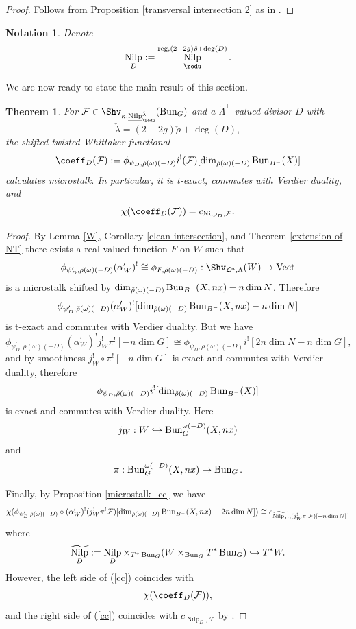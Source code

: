 \documentclass[9pt]{amsart}
\DeclareMathOperator{\reg}{{reg}}
\newcommand{\cF}{{\mathcal F}}
\newcommand{\cL}{{\mathcal L}}
\newtheorem{thm}[subsubsection]{Theorem}
\DeclareMathOperator{\Nilp}{{Nilp}} \DeclareMathOperator{\op}{{op}}
\DeclareMathOperator{\Vect}{{Vect}}
\newtheorem{ntn}[subsubsection]{Notation}
\numberwithin{equation}{section}
\begin{document}
\begin{proof}
	Follows from Proposition \ref{transversal intersection 2} as in \cite[Proposition 3.3.3]{NT}.
\end{proof}

\begin{ntn}
	Denote $$\Nilp_D:= \Nilp^{\reg, (2-2g)\check{\rho} + \deg(D)}_{\redu}.$$
\end{ntn}

We are now ready to state the main result of this section. 

\begin{thm}\label{whittaker functional is microstalk}
	For $\cF \in \Shv_{\kappa, \underline{\Nilp}_{\redu}^{\check{\lambda}}}(\Bun_G)$ and a $\check{\Lambda}^+$-valued divisor $D$ with $$\check{\lambda} = (2-2g)\check{\rho} + \deg(D),$$ the shifted twisted Whittaker functional 
	$$\coeff_D(\cF):= \phi_{\psi_D, \check{\rho}(\omega)(-D)} i^!(\cF) [\dim_{\check{\rho}(\omega)(-D)}  \Bun_{B^-}(X)]$$
	calculates microstalk. In particular, it is t-exact, commutes with Verdier duality, and 
	$$\chi(\coeff_D(\cF)) = c_{\Nilp_D, \cF}.$$
\end{thm}

\begin{proof}
	By Lemma \ref{W}, Corollary \ref{clean intersection}, and Theorem \ref{extension of NT} there exists a real-valued function $F$ on $W$ such that 
	$$\phi_{\psi_D^{\prime}, \check{\rho}(\omega)(-D)} ({{\alpha}^{\prime}_W})^! \cong \phi_{F, \check{\rho}(\omega)(-D)}: \Shv_{\cL^a, \Lambda}(W) \rightarrow \Vect$$
	is a microstalk shifted by $\dim_{\check{\rho}(\omega)(-D)} \operatorname{{Bun}}_{B^-}(X, nx) - n\dim N$. Therefore $$\phi_{\psi_D^{\prime}, \check{\rho}(\omega)(-D)} ({{\alpha}^{\prime}_W})^![\dim_{\check{\rho}(\omega)(-D)} \operatorname{{Bun}}_{B^-}(X, nx) - n\dim N]$$ is t-exact and commutes with Verdier duality.
	But we have 
	$$\phi_{\psi_D^{\prime}, \check{\rho}(\omega)(-D)}({{\alpha}^{\prime}_W})^! j_W^!\pi^![-n \dim G]\cong  \phi_{\psi_D, \check{\rho}(\omega)(-D)} i^! [2n\dim N - n \dim G],$$
	and by smoothness $j_W^! \circ \pi^![-n \dim G]$ is exact and commutes with Verdier duality, therefore 
	$$  \phi_{\psi_D, \check{\rho}(\omega)(-D)} i^! [\dim_{\check{\rho}(\omega)(-D)} \operatorname{{Bun}}_{B^-}(X) ]$$
	is exact and commutes with Verdier duality. Here $$j_W: W \hookrightarrow \operatorname{{Bun}}_G^{\omega(-D)}(X, nx)$$ and $$\pi: \operatorname{{Bun}}_G^{\omega(-D)}(X, nx) \rightarrow \operatorname{{Bun}}_G.$$
	
	Finally, by Proposition \ref{microstalk_cc} we have 
	\begin{equation}\label{cc}
		\chi(\phi_{\psi_D^{\prime}, \check{\rho}(\omega)(-D)} \circ ({{\alpha}^{\prime}_W})^! (j_W^!\pi^!\cF)[\dim_{\check{\rho}(\omega)(-D)} \Bun_{B^-}(X, nx) - 2n\dim N]) \cong c_{\widetilde{\Nilp_D},(j_W^!\pi^!\cF)[-n\dim N] },
	\end{equation}
	where $$\widetilde{\Nilp_D}:= \Nilp_D \times_{T^*\Bun_G} (W \times_{\Bun_G} T^*\Bun_G) \hookrightarrow T^*W.$$
	However, the left side of (\ref{cc}) coincides with 
	$$\chi(\coeff_D(\cF)),$$
	and the right side of (\ref{cc}) coincides with $c_{\Nilp_D, \cF}$ by \cite[Proposition 9.4.3]{KS}.
	
	
\end{proof}
\end{document}

